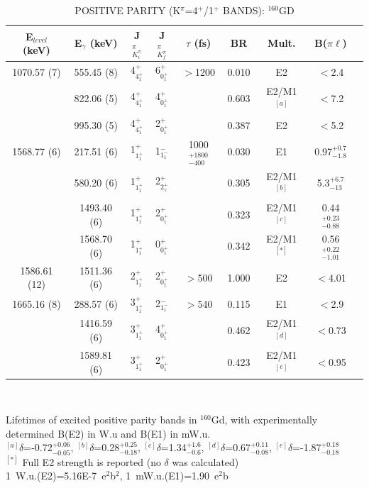 \begin{table}[h!]
\begin{center}
\caption{POSITIVE PARITY (K$^\pi$=4$^+$/1$^+$ BANDS): $^{160}$GD \label{tab:160Gd_posparity}}
\begin{tabular}{ccccccccc}
E$_{level}$ (keV) & E$_\gamma$ (keV) & J$^\pi_{K^\pi_i}$ & J$^\pi_{K^\pi_f}$ & $\tau$ (fs) & BR & Mult. &  B($\pi\ell$) \\
\hline
\hline
1070.57 (7) & 555.45 (8) & 4$^+_{4^+_1}$ & 6$^+_{0^+_1}$ & $>$1200  & 0.010 & E2            & $<$2.4  \\
            & 822.06 (5) & 4$^+_{4^+_1}$ & 4$^+_{0^+_1}$ &          & 0.603 & E2/M1$^{[a]}$ & $<$7.2  \\
            & 995.30 (5) & 4$^+_{4^+_1}$ & 2$^+_{0^+_1}$ &          & 0.387 & E2            & $<$5.2  \\
            \hline
1568.77 (6) & 217.51 (6)  & 1$^+_{1^+_1}$ & 1$^-_{1^-_1}$ & 1000$^{+1800}_{-400}$  & 0.030 & E1             & 0.97$^{+0.7}_{-1.8}$ \\
            & 580.20 (6)  & 1$^+_{1^+_1}$ & 2$^+_{2^+_\gamma}$ &                   & 0.305 & E2/M1$^{[b]}$  & 5.3$^{+6.7}_{-13}$  \\
            & 1493.40 (6) & 1$^+_{1^+_1}$ & 2$^+_{0^+_1}$ &                        & 0.323 & E2/M1$^{[c]}$  & 0.44$^{+0.23}_{-0.88}$  \\
            & 1568.70 (6) & 1$^+_{1^+_1}$ & 0$^+_{0^+_1}$ &                        & 0.342 & E2/M1$^{[*]}$  & 0.56$^{+0.22}_{-1.01}$  \\
1586.61 (12) & 1511.36 (6) & 2$^+_{1^+_1}$ & 2$^+_{0^+_1}$& $>$500                 & 1.000 & E2            & $<$4.01  \\
1665.16 (8) & 288.57 (6)  & 3$^+_{1^+_1}$ & 2$^-_{1^-_1}$ & $>$540                 & 0.115 & E1            & $<$2.9 \\
            & 1416.59 (6) & 3$^+_{1^+_1}$ & 4$^+_{0^+_1}$ &                        & 0.462 & E2/M1$^{[d]}$ & $<$0.73  \\
            & 1589.81 (6) & 3$^+_{1^+_1}$ & 2$^+_{0^+_1}$ &                        & 0.423 & E2/M1$^{[e]}$ & $<$0.95  \\
            \hline

\end{tabular}\\ \vspace{10pt}
\end{center}
Lifetimes of excited positive parity bands in $^{160}$Gd, with experimentally determined B(E2) in W.u and  B(E1) in mW.u. \\
$^{[a]}\delta$=-0.72$^{+0.06}_{-0.05}$, $^{[b]}\delta$=0.28$^{+0.25}_{-0.18}$, $^{[c]}\delta$=1.34$^{+1.6}_{-0.6}$, $^{[d]}\delta$=0.67$^{+0.11}_{-0.08}$, $^{[e]}\delta$=-1.87$^{+0.18}_{-0.18}$\\
$^{[*]}$ Full E2 strength is reported (no $\delta$ was calculated)\\
1~W.u.(E2)=5.16E-7~e$^2$b$^2$, 1~mW.u.(E1)=1.90~e$^2$b\\
\end{table}

